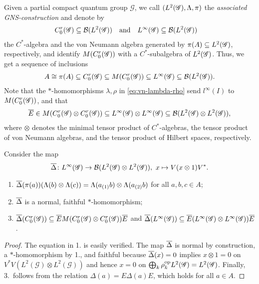 Given a partial compact quantum group $\mathscr{G}$, we call
$(L^{2}(\mathscr{G}),\Lambda,\pi)$ the \emph{associated GNS-construction} and denote by
\begin{align}
  C^{r}_{0}(\mathscr{G}) &\subseteq {\cal B}(L^{2}(\mathscr{G})) &&\text{and} & L^{\infty}(\mathscr{G}) &\subseteq {\cal B}(L^{2}(\mathscr{G}))
\end{align}
the $C^{*}$-algebra and the von Neumann algebra generated by $\pi(A)
\subseteq L^{2}(\mathscr{G})$, respectively, and identify $M(C^{r}_{0}(\mathscr{G}))$ with a
$C^{*}$-subalgebra of $L^{2}(\mathscr{G})$.  Thus, we get a sequence of inclusions
\begin{align*}
A \cong \pi(A) \subseteq
  C^{r}_{0}(\mathscr{G}) \subseteq M(C^{r}_{0}(\mathscr{G})) \subseteq
L^{\infty}(\mathscr{G}) \subseteq {\cal B}(L^{2}(\mathscr{G})).
\end{align*}
Note that
 the $*$-homomorphisms $\lambda,\rho$ in
\eqref{eq:vn-lambda-rho} send $l^{\infty}(I)$ to $M(C^{r}_{0}(\mathscr{G}))$, and that
\begin{align*}
  \overline{E} \in M(C^{r}_{0}(\mathscr{G}) \otimes C^{r}_{0}(\mathscr{G})) \subseteq L^{\infty}(\mathscr{G}) \otimes L^{\infty}(\mathscr{G})
  \subseteq {\cal B}(L^{2}(\mathscr{G}) \otimes L^{2}(\mathscr{G})),
\end{align*}
where $\otimes$ denotes the minimal tensor product
of $C^{*}$-algebras, the tensor product of von Neumann algebras, and
the tensor product of Hilbert spaces, respectively.

Consider the map 
\begin{align*}
  \overline{\Delta} \colon L^{\infty}(\mathscr{G}) \to {\cal B}(L^{2}(\mathscr{G}) \otimes L^{2}(\mathscr{G})), \ x
  \mapsto V(x \otimes 1)V^{*}.
\end{align*}
\begin{Lem} \label{lemma:vn-delta}
  \begin{enumerate}
  \item $\overline{\Delta}(\pi(a)) (\Lambda(b) \otimes \Lambda(c)) =
    \Lambda(a_{(1)}b) \otimes \Lambda(a_{(2)}b)$ for all $a,b,c\in A$;
  \item $\overline{\Delta}$ is a normal, faithful $*$-homomorphism;
  \item  $\overline{\Delta}(C^{r}_{0}(\mathscr{G})) \subseteq \overline{E} M(C^{r}_{0}(\mathscr{G}) \otimes
  C^{r}_{0}(\mathscr{G}))\overline{E}$ and $\overline{\Delta}(L^{\infty}(\mathscr{G})) \subseteq \overline{E}(L^{\infty}(\mathscr{G}) \otimes
  L^{\infty}(\mathscr{G}))\overline{E}$.
  \end{enumerate}
\end{Lem}
\begin{proof}
  The equation in 1.{} is easily verified. The map $\overline{\Delta}$ is
  normal by construction, a $*$-homo\-morphism by 1.{}, and faithful
  because $\overline{\Delta}(x)=0$ implies $x\otimes 1=0$ on
  $V^{*}V(L^{2}(\mathscr{G}) \otimes L^{2}(\mathscr{G}))$ and hence
  $x=0$ on $\bigoplus_{k}
  \rho_{k}^{\operatorname{\mathrm{op}}}L^{2}(\mathscr{G})=L^{2}(\mathscr{G})$. Finally, 3.\
  follows from the relation $\Delta(a)=E\Delta(a)E$, which holds for
  all $a\in A$.
\end{proof}

